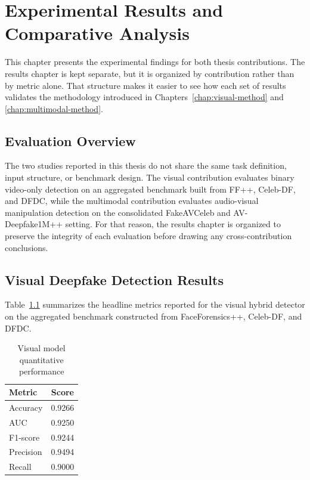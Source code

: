 \chapter{Experimental Results and Comparative Analysis}
\label{chap:results}

This chapter presents the experimental findings for both thesis contributions. The results chapter is kept separate, but it is organized by contribution rather than by metric alone. That structure makes it easier to see how each set of results validates the methodology introduced in Chapters~\ref{chap:visual-method} and \ref{chap:multimodal-method}.

\section{Evaluation Overview}

The two studies reported in this thesis do not share the same task definition, input structure, or benchmark design. The visual contribution evaluates binary video-only detection on an aggregated benchmark built from FF++, Celeb-DF, and DFDC, while the multimodal contribution evaluates audio-visual manipulation detection on the consolidated FakeAVCeleb and AV-Deepfake1M++ setting. For that reason, the results chapter is organized to preserve the integrity of each evaluation before drawing any cross-contribution conclusions.

\section{Visual Deepfake Detection Results}

Table~\ref{tab:visual-metrics} summarizes the headline metrics reported for the visual hybrid detector on the aggregated benchmark constructed from FaceForensics++, Celeb-DF, and DFDC.

\begin{table}[H]
\centering
\caption{Visual model quantitative performance}
\label{tab:visual-metrics}
\begin{tabular}{l c}
\toprule
\textbf{Metric} & \textbf{Score} \\
\midrule
Accuracy & 0.9266 \\
AUC & 0.9250 \\
F1-score & 0.9244 \\
Precision & 0.9494 \\
Recall & 0.9000 \\
\bottomrule
\end{tabular}
\end{table}

